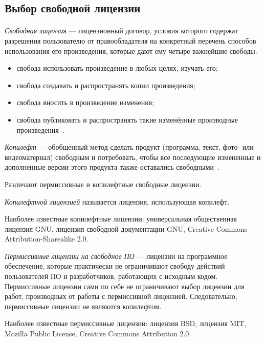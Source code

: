 \subsection{Выбор свободной лицензии}
\label{ssec:choice_free_licenses}

\paragraph{}
\textit{Свободная лицензия} --- лицензионный договор,
условия которого содержат разрешения пользователю от правообладателя
на конкретный перечень способов использования его произведения,
которые дают ему четыре важнейшие свободы:

\begin{itemize}
\item  
  свобода использовать произведение в любых целях, изучать его;
\item
  свобода создавать и распространять копии произведения;
\item
  свобода вносить в произведение изменения;
\item
  свобода публиковать и распространять такие изменённые производные произведения~\cite{wiki_free_license}.
\end{itemize}

\textit{Копилефт} --- обобщенный метод сделать продукт
(программа, текст, фото- или видеоматериал) свободным и потребовать,
чтобы все последующие измененные и дополненные версии этого продукта также оставались свободными~\cite{gnu_copyleft}.

Различают пермиссивные и копилефтные свободные лицензии.

\textit{Копилефтной лицензией} называется лицензия, использующая копилефт.

Наиболее известные копилефтные лицензии: универсальная общественная лицензия GNU, 
 лицензия свободной документации GNU, Creative Commons Attribution-Sharealike 2.0.

\textit{Пермиссивные лицензии на свободное ПО} --- лицензии на программное
обеспечение, которые практически не ограничивают свободу действий пользователей
ПО и разработчиков, работающих с исходным кодом.
Пермиссивные лицензии сами по себе не ограничивают выбор лицензии для работ,
производных от работы с пермиссивной лицензией. Следовательно, пермиссивные лицензии не являются копилефтом.

Наиболее известные пермиссивные лицензии: лицензия BSD, лицензия MIT, Mozilla Public License, Creative Commons Attribution 2.0.

